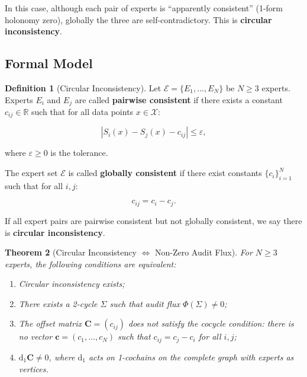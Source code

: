 \documentclass[12pt,a4paper]{article}
\theoremstyle{plain}
\newtheorem{theorem}{Theorem}
\theoremstyle{definition}
\newtheorem{definition}[theorem]{Definition}
\theoremstyle{remark}
\newcommand{\R}{\mathbb{R}}
\newcommand{\dd}{\mathrm{d}}
\begin{document}
In this case, although each pair of experts is ``apparently consistent'' (1-form holonomy zero), globally the three are self-contradictory. This is \textbf{circular inconsistency}.

\subsection{Formal Model}
\label{sec:formal_model}

\begin{definition}[Circular Inconsistency]
\label{def:circular}
Let $\mathcal{E} = \{E_1, \ldots, E_N\}$ be $N \geq 3$ experts. Experts $E_i$ and $E_j$ are called \textbf{pairwise consistent} if there exists a constant $c_{ij} \in \R$ such that for all data points $x \in \mathcal{X}$:

\begin{equation}\label{eq:pairwise_cons}
    |S_i(x) - S_j(x) - c_{ij}| \leq \varepsilon,
\end{equation}

where $\varepsilon \geq 0$ is the tolerance.

The expert set $\mathcal{E}$ is called \textbf{globally consistent} if there exist constants $\{c_i\}_{i=1}^N$ such that for all $i,j$:

\begin{equation}\label{eq:global_cons}
    c_{ij} = c_i - c_j.
\end{equation}

If all expert pairs are pairwise consistent but not globally consistent, we say there is \textbf{circular inconsistency}.
\end{definition}

\begin{theorem}[Circular Inconsistency $\iff$ Non-Zero Audit Flux]
\label{thm:circular_flux}
For $N \geq 3$ experts, the following conditions are equivalent:

\begin{enumerate}[label=(\roman*), leftmargin=*]
    \item Circular inconsistency exists;
    \item There exists a 2-cycle $\Sigma$ such that audit flux $\Phi(\Sigma) \neq 0$;
    \item The offset matrix $\mathbf{C} = (c_{ij})$ does not satisfy the cocycle condition: there is no vector $\mathbf{c} = (c_1, \ldots, c_N)$ such that $c_{ij} = c_j - c_i$ for all $i,j$;
    \item $\dd_1 \mathbf{C} \neq 0$, where $\dd_1$ acts on 1-cochains on the complete graph with experts as vertices.
\end{enumerate}
\end{theorem}
\end{document}

